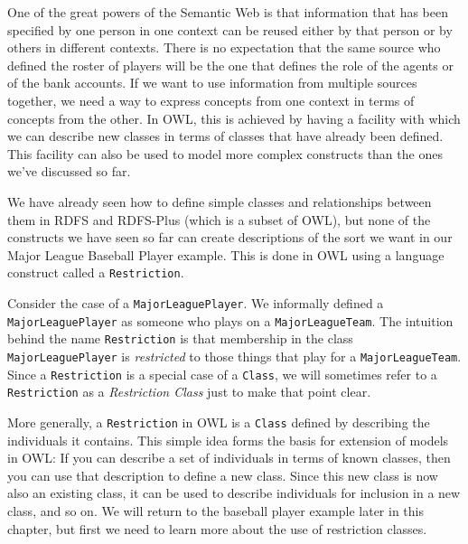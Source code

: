 One of the great powers of the Semantic Web is that information that has
been specified by one person in one context can be reused either by that
person or by others in different contexts. There is no expectation that
the same source who defined the roster of players will be the one that
defines the role of the agents or of the bank accounts. If we want to
use information from multiple sources together, we need a way to express
concepts from one context in terms of concepts from the other. In OWL,
this is achieved by having a facility with which we can describe new
classes in terms of classes that have already been defined. This
facility can also be used to model more complex constructs than the ones
we've discussed so far.

We have already seen how to define simple classes and relationships
between them in RDFS and RDFS-Plus (which is a subset of OWL), but none of the constructs we have seen so
far can create descriptions of the sort we want in our Major League
Baseball Player example. This is done in OWL using a language construct
called a \texttt{Restriction}.

Consider the case of a \texttt{MajorLeaguePlayer}. We informally defined a \texttt{MajorLeaguePlayer} as someone who plays on a \texttt{MajorLeagueTeam}. The intuition
behind the name \texttt{Restriction} is that membership in the class
\texttt{MajorLeaguePlayer} is \emph{restricted} to those things that play for a
\texttt{MajorLeagueTeam}. Since a \texttt{Restriction} is a special case of a \texttt{Class}, we
will sometimes refer to a \texttt{Restriction} as a \emph{Restriction Class} just to
make that point clear.

More generally, a \texttt{Restriction} in OWL is a \texttt{Class} defined by describing
the individuals it contains. This simple idea forms the basis for
extension of models in OWL: If you can describe a set of individuals in
terms of known classes, then you can use that description to define a
new class. Since this new class is now also an existing class, it can be
used to describe individuals for inclusion in a new class, and so on. We
will return to the baseball player example later in this chapter, but
first we need to learn more about the use of restriction classes.

